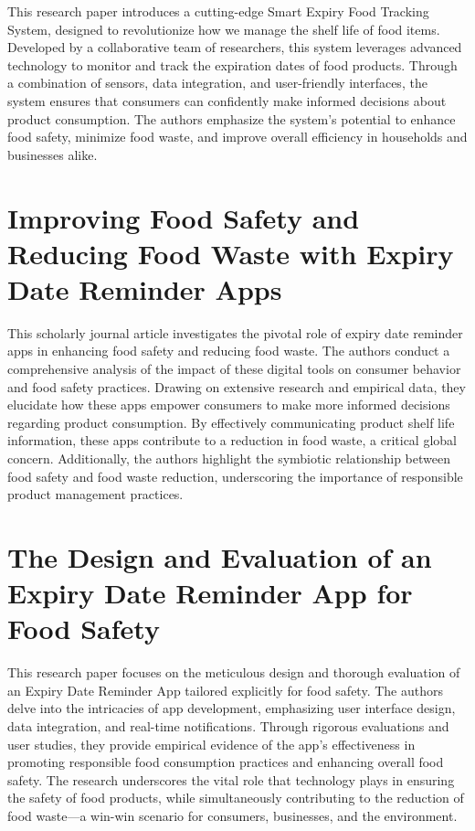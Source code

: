 This research paper introduces a cutting-edge Smart Expiry Food Tracking System, designed to revolutionize how we manage the shelf life of food items. Developed by a collaborative team of researchers, this system leverages advanced technology to monitor and track the expiration dates of food products. Through a combination of sensors, data integration, and user-friendly interfaces, the system ensures that consumers can confidently make informed decisions about product consumption. The authors emphasize the system's potential to enhance food safety, minimize food waste, and improve overall efficiency in households and businesses alike.

\section{Improving Food Safety and Reducing Food Waste with Expiry Date Reminder Apps}

This scholarly journal article investigates the pivotal role of expiry date reminder apps in enhancing food safety and reducing food waste. The authors conduct a comprehensive analysis of the impact of these digital tools on consumer behavior and food safety practices. Drawing on extensive research and empirical data, they elucidate how these apps empower consumers to make more informed decisions regarding product consumption. By effectively communicating product shelf life information, these apps contribute to a reduction in food waste, a critical global concern. Additionally, the authors highlight the symbiotic relationship between food safety and food waste reduction, underscoring the importance of responsible product management practices.

\section{The Design and Evaluation of an Expiry Date Reminder App for Food Safety}

This research paper focuses on the meticulous design and thorough evaluation of an Expiry Date Reminder App tailored explicitly for food safety. The authors delve into the intricacies of app development, emphasizing user interface design, data integration, and real-time notifications. Through rigorous evaluations and user studies, they provide empirical evidence of the app's effectiveness in promoting responsible food consumption practices and enhancing overall food safety. The research underscores the vital role that technology plays in ensuring the safety of food products, while simultaneously contributing to the reduction of food waste—a win-win scenario for consumers, businesses, and the environment.







